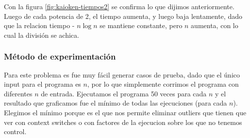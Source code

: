 Con la figura \ref{fig:kaioken-tiempos2} se confirma lo que dijimos anteriormente. Luego de cada potencia de 2, el tiempo aumenta, y luego baja lentamente, dado que la relacion tiempo - $n \log n$ se mantiene constante, pero $n$ aumenta, con lo cual la división se achica.


\subsubsection{M\'etodo de experimentación}

Para este problema es fue muy fácil generar casos de prueba, dado que el único input para el programa es $n$, por lo que simplemente corrimos el programa con diferentes $n$ de entrada. Ejecutamos el programa 50 veces para cada $n$ y el resultado que graficamos fue el mínimo de todas las ejecuciones (para cada $n$). Elegimos el mínimo porque es el que nos permite eliminar outliers que tienen que ver con context switches o con factores de la ejecucion sobre los que no tenemos control.


